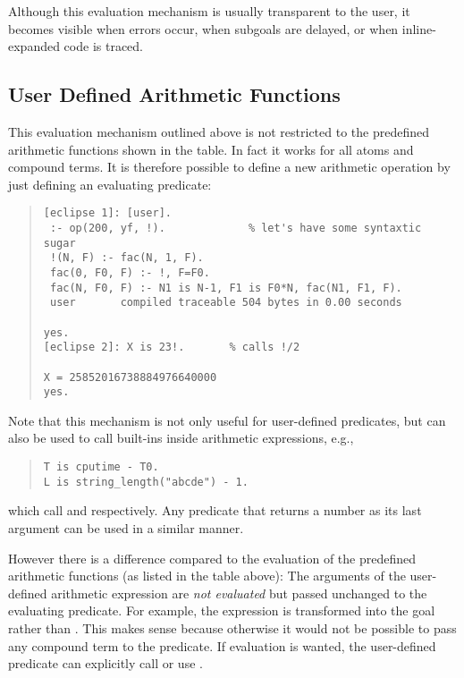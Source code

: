Although this evaluation mechanism is usually transparent to the user, it
becomes visible when errors occur, when subgoals are delayed, or
when inline-expanded code is traced.

\subsection{User Defined Arithmetic Functions}
This evaluation mechanism outlined above is not restricted to the
predefined arithmetic functions shown in the table.
In fact it works for all atoms and compound terms.
It is therefore possible to define a new arithmetic operation by
just defining an evaluating predicate:
\begin{quote}
\begin{verbatim}
[eclipse 1]: [user].
 :- op(200, yf, !).             % let's have some syntaxtic sugar
 !(N, F) :- fac(N, 1, F).
 fac(0, F0, F) :- !, F=F0.
 fac(N, F0, F) :- N1 is N-1, F1 is F0*N, fac(N1, F1, F).
 user       compiled traceable 504 bytes in 0.00 seconds

yes.
[eclipse 2]: X is 23!.       % calls !/2

X = 25852016738884976640000
yes.
\end{verbatim}
\end{quote}
Note that this mechanism is not only useful for user-defined predicates, but
can also be used to call {\eclipse} built-ins inside arithmetic expressions,
e.g.,
\begin{quote}
\begin{verbatim}
T is cputime - T0.
L is string_length("abcde") - 1.
\end{verbatim}\end{quote}
which call  and
respectively.
Any predicate that returns a number as its last argument
can be used in a similar manner.

However there is a difference compared to the evaluation of the predefined
arithmetic functions (as listed in the table above):
The arguments of the user-defined arithmetic expression are \emph{not
evaluated} but passed unchanged to the evaluating predicate.
For example, the expression  is transformed into the goal
 rather than .
This makes sense because otherwise it would not be possible to pass
any compound term to the predicate.
If evaluation is wanted, the user-defined predicate can explicitly call
 or use .

